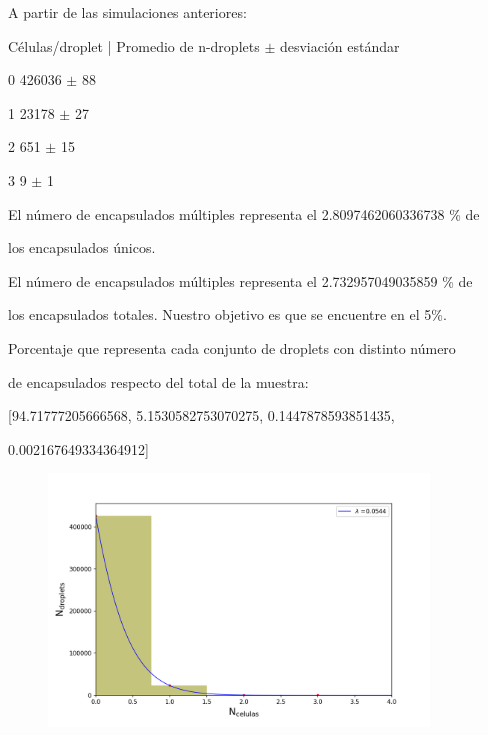 {{A partir de las simulaciones anteriores:

Células/droplet | Promedio de n-droplets $\pm$ desviación estándar

  0   426036 $\pm$ 88
  
  1   23178 $\pm$ 27
  
  2   651 $\pm$ 15
  
  3   9 $\pm$ 1
  
\vspace{5mm}

El número de encapsulados múltiples representa el  2.8097462060336738 \% de

los encapsulados únicos.

\vspace{5mm}

El número de encapsulados múltiples representa el 2.732957049035859 \% de 

los encapsulados totales. Nuestro objetivo es que se encuentre en el 5\%.

\vspace{5mm}

Porcentaje que representa cada conjunto de droplets con distinto número 

de encapsulados respecto del total de la muestra:

 [94.71777205666568, 5.1530582753070275, 0.1447878593851435,
 
 0.002167649334364912]
 
}%
 
\vspace{5mm}
}

\vspace{-7mm}

\begin{figure}[H]
    \begin{center}
         \includegraphics[angle=0,width=0.9\textwidth]{4_resultados/histograma_1x.png}
    \end{center}
\end{figure}



